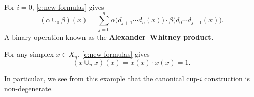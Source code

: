\begin{example} \label{ex:alexander-whitney diagonal}
	For $i = 0$, \cref{e:new formulas} gives
	\begin{equation*}
	(\alpha \cup_0 \beta)(x) =
	\sum_{j=0}^n \alpha \big(d_{j+1} \cdots d_{n}(x)\big) \cdot \beta \big(d_{0} \cdots d_{j-1}(x)\big).
	\end{equation*}
	A binary operation known as the \textbf{Alexander--Whitney product}.
\end{example}

\begin{example} \label{ex:Sq0 is the identity}
	For any simplex $x \in X_n$, \cref{e:new formulas} gives
	\begin{equation*}
	(x \cup_n x)(x) = x(x) \cdot x(x) = 1.
	\end{equation*}
\end{example}

In particular, we see from this example that the canonical cup-$i$ construction is non-degenerate.

